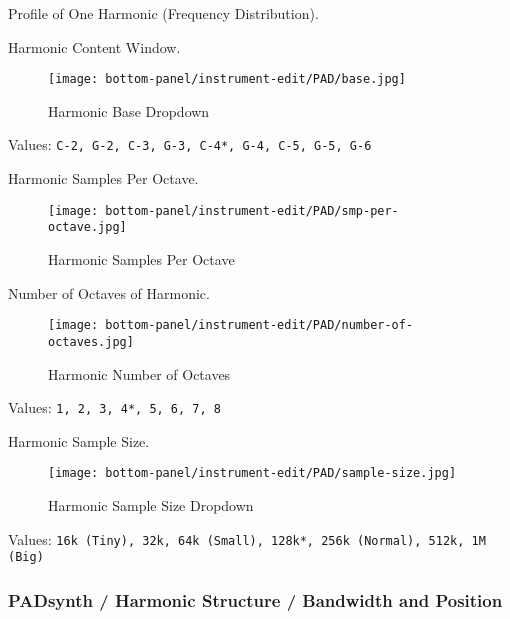    \setcounter{ItemCounter}{0}      %

   Profile of One Harmonic (Frequency Distribution).

   Harmonic Content Window.


\begin{figure}[H]
   \centering 
   \texttt{[image: bottom-panel/instrument-edit/PAD/base.jpg]}
   \caption{Harmonic Base Dropdown}
   \label{fig:padsynth_harmonic_base_dropdown}
\end{figure}

   Values: \texttt{C-2, G-2, C-3, G-3, C-4*, G-4, C-5, G-5, G-6}

   Harmonic Samples Per Octave.

\begin{figure}[H]
   \centering 
   \texttt{[image: bottom-panel/instrument-edit/PAD/smp-per-octave.jpg]}
   \caption{Harmonic Samples Per Octave}
   \label{fig:padsynth_harmonic_samples_per_octave}
\end{figure}

   Number of Octaves of Harmonic.

\begin{figure}[H]
   \centering 
   \texttt{[image: bottom-panel/instrument-edit/PAD/number-of-octaves.jpg]}
   \caption{Harmonic Number of Octaves}
   \label{fig:padsynth_harmonic_number_of_octaves}
\end{figure}

   Values: \texttt{1, 2, 3, 4*, 5, 6, 7, 8}

   Harmonic Sample Size.

\begin{figure}[H]
   \centering 
   \texttt{[image: bottom-panel/instrument-edit/PAD/sample-size.jpg]}
   \caption{Harmonic Sample Size Dropdown}
   \label{fig:padsynth_harmonic_sample_size_dropdown}
\end{figure}

   Values: \texttt{16k (Tiny), 32k, 64k (Small), 128k*, 256k (Normal), 512k, 1M (Big)}

\subsubsection{PADsynth / Harmonic Structure / Bandwidth and Position}
\label{subsubsec:padsynth_harmonic_structure_bw_and_pos}

